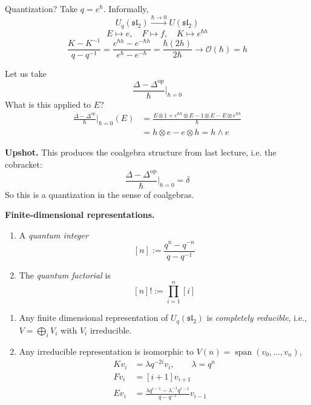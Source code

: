 Quantization? Take $q=e^{\hbar}$.
Informally,
$$
U_{q}(\mathfrak{sl}_{2})
\overset{\hbar\to 0}{\longrightarrow}
U(\mathfrak{sl}_{2})
$$
$$
E\mapsto e,\quad F\mapsto f,\quad
K\mapsto e^{\hbar h}
$$
$$
\frac{K-K^{-1}}{q-q^{-1}}=
\frac{e^{\hbar h}-e^{-\hbar h}}
{e^{\hbar}-e^{-\hbar}}=
\frac{\hbar(2h)}{2\hbar}
\to \mathcal{O}(\hbar) =h
$$

Let us take
$$
\frac{\Delta-\Delta^{\operatorname{op}}}
{\hbar}\Big|_{\hbar=0}
$$
What is this applied to $E$?
$$
\begin{aligned}
\frac{\Delta-\Delta^{\operatorname{op}}}
{\hbar}\Big|_{\hbar=0}(E)
&=\frac{E\otimes 1+e^{\hbar h}\otimes E
-1\otimes E-E\otimes e^{\hbar h}}{\hbar}\\
&=h\otimes e-e\otimes h=h\wedge e
\end{aligned}
$$

\begin{remark}
\label{remark-l3-upshot}
{\bf Upshot.}
This produces the coalgebra structure
from last lecture, i.e. the cobracket:
$$
\frac{\Delta-\Delta^{\operatorname{op}}}
{\hbar}\Big|_{\hbar =0}=\delta
$$
So this is a quantization in the sense of
coalgebras.
\end{remark}

\medskip\noindent
{\bf Finite-dimensional representations.}

\begin{definition}[Notations]
\label{definition-l3-quantum-integers}
\begin{enumerate}
\item A {\it quantum integer}
$$
[n]:=\frac{q^{n}-q^{-n}}{q-q^{-1}}
$$
\item The {\it quantum factorial} is
$$
[n]!:=\prod_{i=1}^{n}[i]
$$
\end{enumerate}
\end{definition}

\begin{theorem}
\label{theorem-l3-representations}
\begin{enumerate}
\item Any finite dimensional
representation of $U_{q}(\mathfrak{sl}_{2})$
is {\it completely reducible}, i.e.,
$V=\bigoplus_{i}V_{i}$ with $V_{i}$
irreducible.
\item Any irreducible representation is
isomorphic to
$V(n)=\operatorname{span}
(v_{0},\ldots,v_{n})$,
$$
\begin{aligned}
Kv_{i}&=\lambda q^{-2i} v_{i},
\qquad \lambda=q^{n}\\
Fv_{i}&=[i+1]v_{i+1}\\
Ev_{i}&=\frac{\lambda q^{i-1}-
\lambda^{-1} q^{i-1}}{q-q^{-1}}v_{i-1}
\end{aligned}
$$
\end{enumerate}
\end{theorem}

